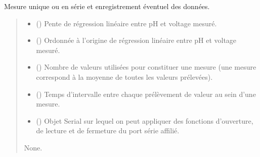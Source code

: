 \documentclass[letterpaper,10pt,french]{sphinxmanual}
\begin{document}

\begin{fulllineitems}
\label{\detokenize{library:lib_pH.measurement}}
\pysigstartsignatures
\pysiglinewithargsret
{}
{\sphinxparamcomma {}\sphinxparamcomma {}\sphinxparamcomma {}\sphinxparamcomma {}}
{}
\pysigstopsignatures
\sphinxAtStartPar
Mesure unique ou en série et enregistrement éventuel des données.
\begin{quote}\begin{description}
\begin{itemize}
\item {} 
\sphinxAtStartPar
{} () \textendash{} Pente de régression linéaire entre pH et voltage mesuré.

\item {} 
\sphinxAtStartPar
{} () \textendash{} Ordonnée à l’origine de régression linéaire entre pH et voltage mesuré.

\item {} 
\sphinxAtStartPar
{} () \textendash{} Nombre de valeurs utilisées pour constituer une mesure (une mesure correspond à la moyenne de toutes les valeurs prélevées).

\item {} 
\sphinxAtStartPar
{} () \textendash{} Temps d’intervalle entre chaque prélèvement de valeur au sein d’une mesure.

\item {} 
\sphinxAtStartPar
{} () \textendash{} Objet Serial sur lequel on peut appliquer des fonctions d’ouverture, de lecture et de fermeture du port série affilié.

\end{itemize}

\sphinxAtStartPar
None.

\end{description}\end{quote}

\end{fulllineitems}
\end{document}
